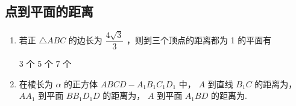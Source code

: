 \subsection*{点到平面的距离}
\begin{enumerate}
    \item 若正 $\bigtriangleup {ABC}$ 的边长为 $\dfrac{4\sqrt{3}}{3}$ ，则到三个顶点的距离都为 1 的平面有 

     {3 个} {5 个} {7 个}

    \item 在棱长为 $\alpha$ 的正方体 ${ABCD} - {A}_{1}{B}_{1}{C}_{1}{D}_{1}$ 中， $A$ 到直线 ${B}_{1}C$ 的距离为， $A{A}_{1}$ 到平面 $B{B}_{1}{D}_{1}D$ 的距离为， $A$ 到平面 ${A}_{1}{BD}$ 的距离为.
    


\end{enumerate}
